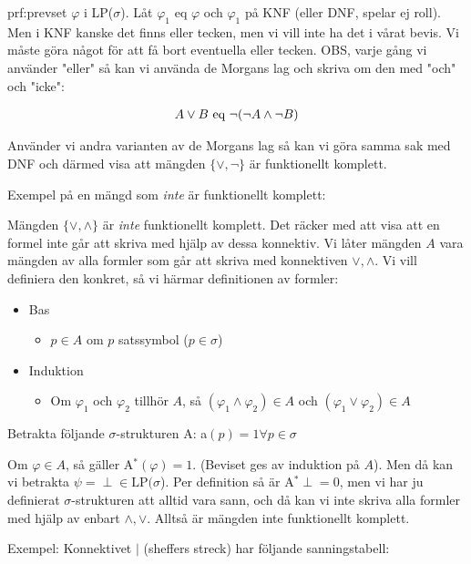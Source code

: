 \begin{prf}{prf:prevset}
  $\varphi$ i LP($\sigma$). Låt $\varphi_1$ eq $\varphi$ och $\varphi_1$ på KNF (eller DNF, spelar ej roll). Men i KNF kanske det finns eller tecken, men vi vill inte ha det i vårat bevis. Vi måste göra något för att få bort eventuella eller tecken. OBS, varje gång vi använder "eller" så kan vi använda de Morgans lag och skriva om den med "och" och "icke":
  \par

  \begin{equation*}
    \begin{gathered}
      A\vee B$ eq $\neg(\neg A\wedge\neg B)
    \end{gathered}
  \end{equation*}\par
  \noindent Använder vi andra varianten av de Morgans lag så kan vi göra samma sak med DNF och därmed visa att mängden $\{\vee,\neg\}$ är funktionellt komplett.
\end{prf}
\par\bigskip
\noindent Exempel på en mängd som \textit{inte} är funktionellt komplett:\par
\noindent Mängden $\{\vee,\wedge\}$ är \textit{inte} funktionellt komplett. Det räcker med att visa att en formel inte går att skriva med hjälp av dessa konnektiv. Vi låter mängden $A$ vara mängden av alla formler som går att skriva med konnektiven $\vee, \wedge$. Vi vill definiera den konkret, så vi härmar definitionen av formler:
\par\bigskip
\begin{itemize}
  \item Bas
    \begin{itemize}
      \item $p\in A$ om $p$ satssymbol ($p\in\sigma$)
    \end{itemize}
  \item Induktion
    \begin{itemize}
      \item Om $\varphi_1$ och $\varphi_2$ tillhör $A$, så $(\varphi_1\wedge\varphi_2)\in A$ och $(\varphi_1\vee\varphi_2)\in A$
    \end{itemize}
\end{itemize}
\par\bigskip
\noindent Betrakta följande $\sigma$-strukturen A: a$(p)=1\forall p\in\sigma$
\par\bigskip
\noindent Om $\varphi\in A$, så gäller A$^*(\varphi)=1$. (Beviset ges av induktion på $A$). Men då kan vi betrakta $\psi =\perp\in\text{LP(}\sigma$). Per definition så är A$^*\perp=0$, men vi har ju definierat $\sigma$-strukturen att alltid vara sann, och då kan vi inte skriva alla formler med hjälp av enbart $\wedge,\vee$. Alltså är mängden inte funktionellt komplett. 
\par\bigskip
\noindent Exempel: Konnektivet $|$ (sheffers streck) har följande sanningstabell:

